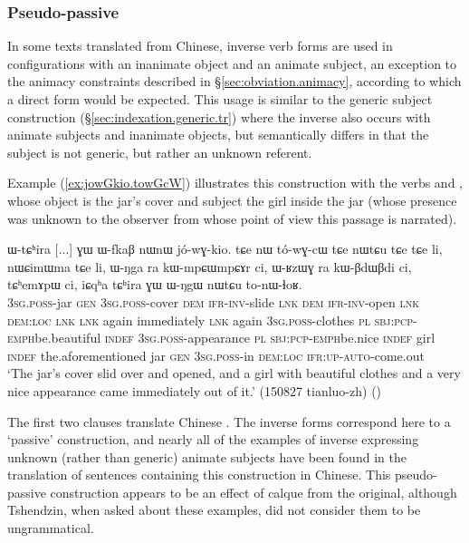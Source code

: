 \subsubsection{Pseudo-passive} \label{sec:pseudo.passive}
In some texts translated from Chinese, inverse verb forms are used in configurations with an inanimate object and an animate subject, an exception to the animacy constraints described in §\ref{sec:obviation.animacy}, according to which a direct form would be expected. This usage is similar to the generic subject construction (§\ref{sec:indexation.generic.tr}) where the inverse also occurs with animate subjects and inanimate objects, but semantically differs in that the subject is not generic, but rather an unknown referent. 

Example (\ref{ex:jowGkio.towGcW}) illustrates this construction with the verbs  and , whose object is the jar's cover and subject the girl inside the jar (whose presence was unknown to the observer from whose point of view this passage is narrated). 

\begin{exe}
\ex \label{ex:jowGkio.towGcW}
\gll ɯ-tɕʰira [...] ɣɯ ɯ-fkaβ nɯnɯ jó-wɣ-kio. tɕe nɯ tó-wɣ-cɯ tɕe nɯtɕu tɕe tɕe li, nɯɕimɯma tɕe li,  ɯ-ŋga ra kɯ-mpɕɯ\redp{}mpɕɤr ci, ɯ-ʁzɯɣ ra kɯ-βdɯ\redp{}βdi ci, tɕʰemɤpɯ ci, iɕqʰa tɕʰira ɣɯ ɯ-ŋgɯ nɯtɕu to-nɯ-ɬoʁ.\\
\textsc{3sg}.\textsc{poss}-jar { } \textsc{gen} \textsc{3sg}.\textsc{poss}-cover \textsc{dem} \textsc{ifr}-\textsc{inv}-slide \textsc{lnk} \textsc{dem} \textsc{ifr}-\textsc{inv}-open \textsc{lnk} \textsc{dem}:\textsc{loc} \textsc{lnk} \textsc{lnk} again immediately \textsc{lnk} again \textsc{3sg}.\textsc{poss}-clothes \textsc{pl} \textsc{sbj}:\textsc{pcp}-\textsc{emph}\redp{}be.beautiful \textsc{indef} \textsc{3sg}.\textsc{poss}-appearance \textsc{pl} \textsc{sbj}:\textsc{pcp}-\textsc{emph}\redp{}be.nice  \textsc{indef} girl \textsc{indef} the.aforementioned jar \textsc{gen} \textsc{3sg}.\textsc{poss}-in \textsc{dem}:\textsc{loc} \textsc{ifr}:\textsc{up}-\textsc{auto}-come.out \\
\glt `The jar's cover slid over and opened, and a girl with beautiful clothes and a very nice appearance came immediately out of it.' (150827 tianluo-zh)
()
\end{exe}

The first two clauses translate Chinese . The inverse forms correspond here to a   `passive' construction, and nearly all of the examples of inverse expressing unknown (rather than generic) animate subjects have been found in the translation of sentences containing this construction in Chinese. This pseudo-passive construction appears to be an effect of calque from the original, although Tshendzin, when asked about these examples, did not consider them to be ungrammatical. 

